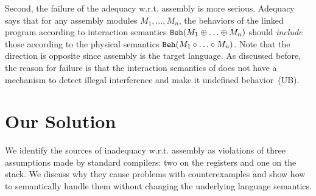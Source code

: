Second, the failure of the adequacy w.r.t. assembly is more serious.
Adequacy says that for any assembly modules $M_1,\ldots,M_n$,
the behaviors of the linked program according to interaction
semantics $\mathtt{Beh}({M_1 \oplus \ldots \oplus M_n})$ should \emph{include}
those according to the physical semantics $\mathtt{Beh}({M_1 \circ \ldots\circ M_n})$.
Note that the direction is opposite since assembly is the target language.
As discussed before, the reason for failure is that
the interaction semantics of \ccc{} does not have a mechanism to detect
illegal interference and make it undefined behavior~(UB).




\section{Our Solution}
\label{sec:overview-semantics:solution}

We identify the sources of inadequacy w.r.t. assembly as violations of
three assumptions made by standard compilers: two on the registers and one on the stack.
We discuss why they 
cause problems with counterexamples and show how to semantically
handle them without changing the underlying language semantics.

  
